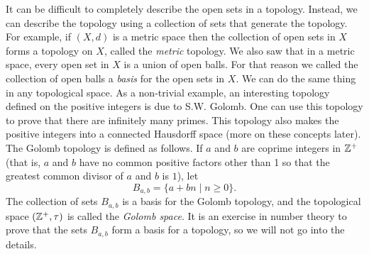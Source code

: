\begin{comment}

\ActivitySolution 

\ba

\item By definition, $\emptyset \in \tau_{FC}$. Since $X \setminus X = \emptyset$ is finite, $X \in \tau_{FC}$. Let $\{O_{\alpha}\}$ be a collection of open sets in $X$ for $\alpha$ in an indexing set $I$. Since $X \setminus O_{\alpha}$ is finite for each $\alpha \in I$, we have that 
\[X \setminus \bigcup_{\alpha \in I} O_{\alpha} = \bigcap_{\alpha \in I} (X \setminus O_{\alpha}) \subseteq (X \setminus O_{\beta}\]
for any $\beta \in I$ is a finite set. Thus, $\bigcup_{\alpha \in I} O_{\alpha} \in \tau_{FC}$. 

Now suppose that $I$ is finite. Then
\[X \setminus \bigcap_{\alpha \in I} O_{\alpha} = \bigcup_{\alpha \in I} (X \setminus O_{\alpha})\]
is a finite union of finite sets and so is finite. Thus, $\bigcap_{\alpha \in I} O_{\alpha} \in \tau_{FC}$. We conclude that $\tau_{FC}$ is a topology. 

\item Suppose $X$ is finite. Then $X \setminus O$ is finite for every subset $O$ of $X$. Thus, every subset of $X$ is open and so $\tau_{FC}$ is the discrete topology.

\ea


\end{comment}

\label{sec_base_top}

It can be difficult to completely describe the open sets in a topology. Instead, we can describe the topology using a collection of sets that generate the topology. For example, if $(X,d)$ is a metric space then the collection of open sets in $X$ forms a topology on $X$, called the \emph{metric}  topology. We also saw that in a metric space, every open set in $X$ is a union of open balls. For that reason we called the collection of open balls a \emph{basis} for the open sets in $X$. We can do the same thing in any topological space. As a non-trivial example, an interesting topology defined on the positive integers is due to S.W. Golomb.  One can use this topology to prove that there are infinitely many primes. This topology also makes the positive integers into a connected Hausdorff space (more on these concepts later). The Golomb topology is defined as follows. If $a$ and $b$ are coprime integers in $\mathbb{Z}^+$ (that is, $a$ and $b$ have no common positive factors other than 1 so that the greatest common divisor of $a$ and $b$ is $1$), let 
\[B_{a,b} = \{a+bn \mid n \geq 0\}.\]
The collection of sets $B_{a,b}$ is a basis for the Golomb topology, and the topological space $(\mathbb{Z}^+, \tau)$ is called the \emph{Golomb space}. It is an exercise in number theory to prove that the sets $B_{a,b}$ form a basis for a topology, so we will not go into the details. 

